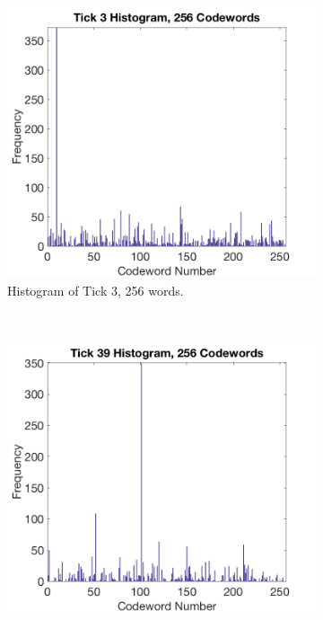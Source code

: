 \documentclass[a4paper, 10pt, conference]{ieeeconf}
\begin{document}
\begin{figure}[!ht]
  \captionsetup[subfigure]{position=b}
  \centering
    \begin{subfigure}{0.45\linewidth}
      \includegraphics[width=\textwidth]{img/tick3_256}
      \caption{Histogram of Tick 3, 256 words.}
      \label{fig:sameclassb}
    \end{subfigure}
    ~
    \begin{subfigure}{0.45\linewidth}
      \includegraphics[width=\textwidth]{img/tick39_256}

\end{subfigure}
\end{figure}
\end{document}
